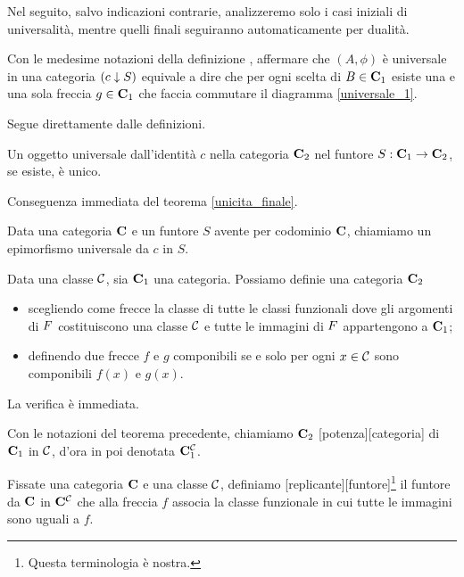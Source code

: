 \par Nel seguito, salvo indicazioni contrarie, analizzeremo solo i casi iniziali di universalit\`a, mentre quelli finali seguiranno automaticamente per dualit\`a.
\begin{Theorem}
	Con le medesime notazioni della definizione \label{universale_def}, affermare che $(A,\phi)$ \`e universale in una categoria $({c} \downarrow {S})$ equivale a dire che per ogni scelta di $B \in \mathbf{C}_1$ esiste una e una sola freccia $g \in \mathbf{C}_1$ che faccia commutare il diagramma \ref{universale_1}.
\end{Theorem}
\Proof Segue direttamente dalle definizioni. \EndProof
\begin{Theorem}
	Un oggetto universale dall'identit\`a $c$ nella categoria $\mathbf{C}_2$ nel funtore $S: \mathbf{C}_1 \rightarrow \mathbf{C}_2$, se esiste, \`e unico.
\end{Theorem}
\Proof Conseguenza immediata del teorema \ref{unicita_finale}. \EndProof
\begin{Definition}\label{def_proiezione}
	Data una categoria $\mathbf{C}$ e un funtore $S$ avente per codominio $\mathbf{C}$, chiamiamo  un epimorfismo universale da $c$ in $S$.
\end{Definition}
\begin{Theorem}
	Data una classe $\mathcal{C}$, sia $\mathbf{C}_1$ una categoria. Possiamo definie una categoria $\mathbf{C}_2$
	\begin{itemize}
		\item scegliendo come frecce la classe di tutte le classi funzionali dove gli argomenti di $F$ costituiscono una classe $\mathcal{C}$ e tutte le immagini di $F$ appartengono a $\mathbf{C}_1$;
		\item definendo due frecce $f$ e $g$ componibili se e solo per ogni $x \in \mathcal{C}$ sono componibili $f(x)$ e $g(x)$.
	\end{itemize}
\end{Theorem}
\Proof La verifica \`e immediata. \EndProof
\begin{Definition}
	Con le notazioni del teorema precedente, chiamiamo $\mathbf{C}_2$ [potenza][categoria] di $\mathbf{C}_1$ in $\mathcal{C}$, d'ora in poi denotata $\mathbf{C}_1^{\mathcal{C}}$.
\end{Definition}
\begin{Definition}
	Fissate una categoria $\mathbf{C}$ e una classe $\mathcal{C}$, definiamo [replicante][funtore]\footnote{Questa terminologia \`e nostra.} il funtore da $\mathbf{C}$ in $\mathbf{C}^{\mathcal{C}}$ che alla freccia $f$ associa la classe funzionale in cui tutte le immagini sono uguali a $f$.
\end{Definition}
